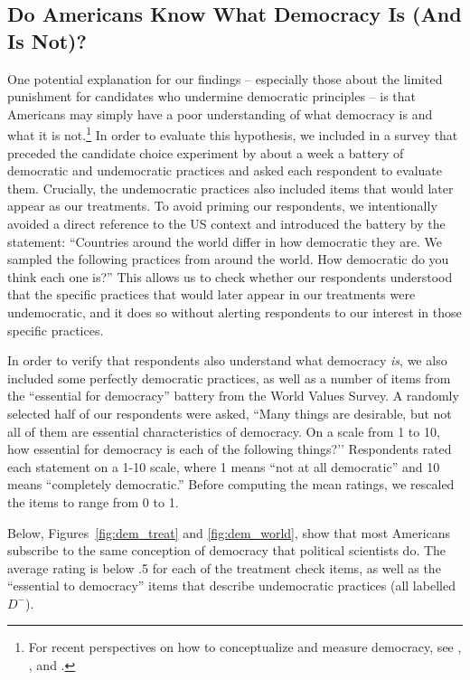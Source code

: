 \documentclass[12pt]{article}
\begin{document}
\newpage

\subsection{Do Americans Know What Democracy Is (And Is Not)?}
\label{sec:dem_q}

One potential explanation for our findings – especially those about the limited punishment for candidates who undermine democratic principles -- is that Americans may simply have a poor understanding of what democracy is and what it is not.\footnote{For recent perspectives on how to conceptualize and measure democracy, see \citet{BoixMillerRosato2013}, \citet{Cheibub2010}, and \citet{Coppedge2011}.} In order to evaluate this hypothesis, we included in a survey that preceded the candidate choice experiment by about a week a battery of democratic and undemocratic practices and asked each respondent to evaluate them. Crucially, the undemocratic practices also included items that would later appear as our treatments. To avoid priming our respondents, we intentionally avoided a direct reference to the US context and introduced the battery by the statement: ``Countries around the world differ in how democratic they are. We sampled the following practices from around the world. How democratic do you think each one is?'' This allows us to check whether our respondents understood that the specific practices that would later appear in our treatments were undemocratic, and it does so without alerting respondents to our interest in those specific practices.

In order to verify that respondents also understand what democracy \textit{is}, we also included some perfectly democratic practices, as well as a number of items from the ``essential for democracy'' battery from the World Values Survey. A randomly selected half of our respondents were asked, ``Many things are desirable, but not all of them are essential characteristics of democracy. On a scale from 1 to 10, how essential for democracy is each of the following things?’’ Respondents rated each statement on a 1-10 scale, where 1 means ``not at all democratic'' and 10 means ``completely democratic.'' Before computing the mean ratings, we rescaled the items to range from 0 to 1.

Below, Figures~\ref{fig:dem_treat} and \ref{fig:dem_world}, show that most Americans subscribe to the same conception of democracy that political scientists do. The average rating is below .5 for each of the treatment check items, as well as the ``essential to democracy'' items that describe undemocratic practices (all labelled $D^-$).
\end{document}
